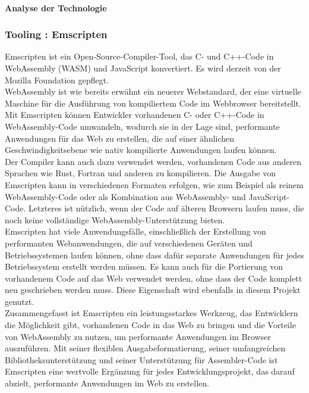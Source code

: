 \paragraph*{Analyse der Technologie}

\subsubsection{Tooling : Emscripten}
Emscripten ist ein Open-Source-Compiler-Tool, das C- und C++-Code in WebAssembly (WASM) und JavaScript konvertiert. Es wird derzeit von der Mozilla Foundation gepflegt. \\
WebAssembly ist wie bereits erwähnt ein neuerer Webstandard, der eine virtuelle Maschine für die Ausführung von kompiliertem Code im Webbrowser bereitstellt. Mit Emscripten können Entwickler vorhandenen C- oder C++-Code in WebAssembly-Code umwandeln, wodurch sie in der Lage sind, performante Anwendungen für das Web zu erstellen, die auf einer ähnlichen Geschwindigkeitsebene wie nativ kompilierte Anwendungen laufen können. \\
Der Compiler kann auch dazu verwendet werden, vorhandenen Code aus anderen Sprachen wie Rust, Fortran und anderen zu kompilieren. Die Ausgabe von Emscripten kann in verschiedenen Formaten erfolgen, wie zum Beispiel als reinem WebAssembly-Code oder als Kombination aus WebAssembly- und JavaScript-Code. Letzteres ist nützlich, wenn der Code auf älteren Browsern laufen muss, die noch keine vollständige WebAssembly-Unterstützung bieten. \\
Emscripten hat viele Anwendungsfälle, einschließlich der Erstellung von performanten Webanwendungen, die auf verschiedenen Geräten und Betriebssystemen laufen können, ohne dass dafür separate Anwendungen für jedes Betriebssystem erstellt werden müssen. Es kann auch für die Portierung von vorhandenem Code auf das Web verwendet werden, ohne dass der Code komplett neu geschrieben werden muss. Diese Eigenschaft wird ebenfalls in diesem Projekt genutzt. \\
Zusammengefasst ist Emscripten ein leistungsstarkes Werkzeug, das Entwicklern die Möglichkeit gibt, vorhandenen Code in das Web zu bringen und die Vorteile von WebAssembly zu nutzen, um performante Anwendungen im Browser auszuführen. Mit seiner flexiblen Ausgabeformatierung, seiner umfangreichen Bibliotheksunterstützung und seiner Unterstützung für Assembler-Code ist Emscripten eine wertvolle Ergänzung für jedes Entwicklungsprojekt, das darauf abzielt, performante Anwendungen im Web zu erstellen. \\
\cite*{emscriptenwebsite}
